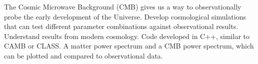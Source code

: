  
  \abstract
   {The Cosmic Microwave Background (CMB) gives us a way to observationally probe the early development of the Universe.}
   {Develop cosmological simulations that can test different parameter combinations against observational results. Understand results from modern cosmology.}
   {Code developed in C++, similar to CAMB or CLASS.}
   {A matter power spectrum and a CMB power spectrum, which can be plotted and compared to observational data.}
   {}


   \maketitle
%
